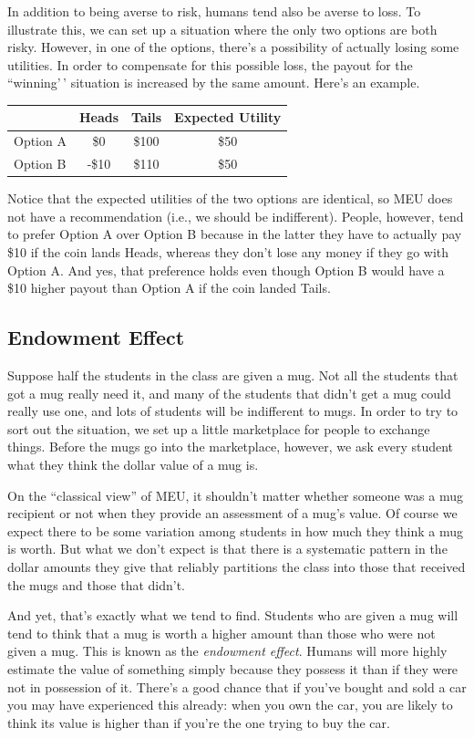 \documentclass[]{tufte-book}
\begin{document}
In addition to being averse to risk, humans tend also be averse to loss. To illustrate this, we can set up a situation where the only two options are both risky. However, in one of the options, there's a possibility of actually losing some utilities. In order to compensate for this possible loss, the payout for the ``winning'\,' situation is increased by the same amount. Here's an example.

\begin{longtable}[]{@{}lccc@{}}
\toprule
& Heads & Tails & Expected Utility\tabularnewline
\midrule
\endhead
Option A & \$0 & \$100 & \$50\tabularnewline
Option B & -\$10 & \$110 & \$50\tabularnewline
\bottomrule
\end{longtable}

Notice that the expected utilities of the two options are identical, so MEU does not have a recommendation (i.e., we should be indifferent). People, however, tend to prefer Option A over Option B because in the latter they have to actually pay \$10 if the coin lands Heads, whereas they don't lose any money if they go with Option A. And yes, that preference holds even though Option B would have a \$10 higher payout than Option A if the coin landed Tails.

\hypertarget{endowment-effect}{%
\subsection{Endowment Effect}\label{endowment-effect}}

Suppose half the students in the class are given a mug. Not all the students that got a mug really need it, and many of the students that didn't get a mug could really use one, and lots of students will be indifferent to mugs. In order to try to sort out the situation, we set up a little marketplace for people to exchange things. Before the mugs go into the marketplace, however, we ask every student what they think the dollar value of a mug is.

On the ``classical view'' of MEU, it shouldn't matter whether someone was a mug recipient or not when they provide an assessment of a mug's value. Of course we expect there to be some variation among students in how much they think a mug is worth. But what we don't expect is that there is a systematic pattern in the dollar amounts they give that reliably partitions the class into those that received the mugs and those that didn't.

And yet, that's exactly what we tend to find. Students who are given a mug will tend to think that a mug is worth a higher amount than those who were not given a mug. This is known as the \emph{endowment effect}. Humans will more highly estimate the value of something simply because they possess it than if they were not in possession of it. There's a good chance that if you've bought and sold a car you may have experienced this already: when you own the car, you are likely to think its value is higher than if you're the one trying to buy the car.
\end{document}
